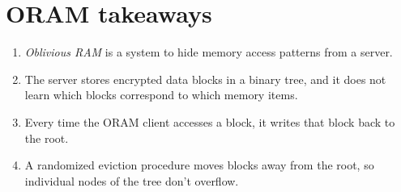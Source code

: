 \section{ORAM takeaways}
\begin{tcolorbox}[takeaways]
\begin{enumerate}
\item
  \emph{Oblivious RAM} is a system to hide memory access patterns from a
  server.
\item
  The server stores encrypted data blocks in a binary tree, and it does
  not learn which blocks correspond to which memory items.
\item
  Every time the ORAM client accesses a block, it writes that block back
  to the root.
\item
  A randomized eviction procedure moves blocks away from the root, so
  individual nodes of the tree don't overflow.
\end{enumerate}
\end{tcolorbox}
